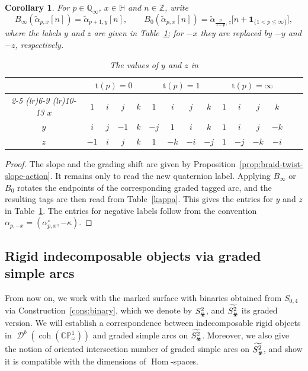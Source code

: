 \documentclass[11pt,a4paper,reqno]{amsart}%
\theoremstyle{plain}
\newtheorem{corollary}[corollary]{Corollary}
\theoremstyle{definition}
\numberwithin{equation}{section}
\numberwithin{equation}{section}
\def\ZZ{\mathbb{Z}}
\newcommand{\QQi}{\mathbb{Q}_\infty}
\newcommand{\Hom}{\operatorname{Hom}\nolimits}
\newcommand{\D}{\operatorname{\mathcal{D}}}
\def\wt{\omega}
\def\x{_\vot}
\def\coh{\operatorname{coh}}
\def\Hom{\operatorname{Hom}}
\newcommand{\typ}[1]{\mathrm{t}(#1)}%
\def\coh{\operatorname{coh}}
\def\CPone{\mathbb{CP}^1_{\wt}}
\newcommand\DC[1]{\D^b(\coh(#1))}
\newcommand{\bfH}{\mathbb{H}}
\def\vot{\text{\Biohazard}}
\begin{document}
\begin{corollary}\label{cor:graded-tag-action}
For $p\in\QQi$, $x\in\bfH$ and $n\in\ZZ$, write
\[
B_\infty(\widetilde{\alpha}_{p,x}[n])
=\widetilde{\alpha}_{p+1,y}[n],
\qquad
B_0(\widetilde{\alpha}_{p,x}[n])
=\widetilde{\alpha}_{\frac{p}{1-p},z}
\bigl[n+\mathbf{1}_{\{1<p\le\infty\}}\bigr],
\]
where the labels $y$ and $z$ are given in Table~\ref{tab:bt-tag-action}; for $-x$ they are replaced by $-y$ and $-z$, respectively.
\begin{table}[htbp]
\centering
\caption{The values of $y$ and $z$ in }
\label{tab:bt-tag-action}
\renewcommand{\arraystretch}{1.2}
\setlength{\tabcolsep}{6pt}

\begin{tabular}{ccccc ccccc ccccc}
\toprule
& \multicolumn{4}{c}{$\typ{p}=0$}
& \multicolumn{4}{c}{$\typ{p}=1$}
& \multicolumn{4}{c}{$\typ{p}=\infty$} \\
\cmidrule(lr){2-5} \cmidrule(lr){6-9} \cmidrule(lr){10-13}
$x$ & $1$ & $i$ & $j$ & $k$
    & $1$ & $i$ & $j$ & $k$
    & $1$ & $i$ & $j$ & $k$ \\
\midrule
$y$ & $i$ & $j$ & $-1$ & $k$
    & $-j$ & $1$ & $i$ & $k$
    & $1$ & $i$ & $j$ & $-k$ \\
$z$ & $-1$ & $i$ & $j$ & $k$
    & $1$ & $-k$ & $-i$ & $-j$
    & $1$ & $-j$ & $-k$ & $-i$ \\
\bottomrule
\end{tabular}
\end{table}
\end{corollary}
\begin{proof}
The slope and the grading shift are given by Proposition~\ref{prop:braid-twist-slope-action}. It remains only to read the new quaternion label. Applying $B_\infty$ or $B_0$ rotates the endpoints of the corresponding graded tagged arc, and the resulting tags are then read from Table~\ref{kappa}. This gives the entries for $y$ and $z$ in Table~\ref{tab:bt-tag-action}. The entries for negative labels follow from the convention $\alpha_{p,-x}=(\alpha_{p,x}^\circ,-\kappa)$.
\end{proof}
 
 


\subsection{Rigid indecomposable objects via graded simple arcs}\label{sec:ind=ca}
 From now on, we work with  the marked surface with binaries obtained from  $S_{0,4}$ via Construction~\ref{cons:binary},  which we denote   by $S\x^2$,     and  
$\widetilde{S\x^2} $ its graded version.  We will establish a correspondence between indecomposable  rigid  objects in $\DC{\CPone}$ and graded simple arcs on $\widetilde{S\x^2} $. Moreover, we also give the notion of oriented intersection number of graded simple arcs on $\widetilde{S\x^2} $, and show it is compatible with the dimensions of $\Hom$-spaces.
 
\end{document}
